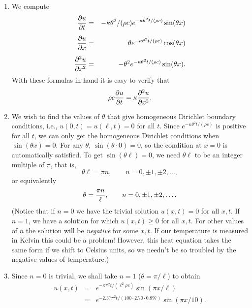 \begin{solution}

\begin{enumerate}
\item We compute
  \begin{eqnarray*}
     {{\partial}u\over {\partial}t} &=& -\kappa \theta^2/(\rho c) e^{-\kappa \theta^2 t/(\rho c)} \sin(\theta x) \\[0.5em]
     {{\partial}u\over {\partial}x} &=& \theta e^{-\kappa \theta^2 t/(\rho c)} \cos(\theta x) \\[0.5em]
     {{\partial}^2 u\over {\partial}x^2} &=& -\theta^2 e^{-\kappa \theta^2 t/(\rho c)} \sin(\theta x).
  \end{eqnarray*}
With these formulas in hand it is easy to verify that 
 \[  \rho c {{\partial} u \over {\partial} t} = \kappa {{\partial}^2 u\over {\partial}x^2}.\]

\item We wish to find the values of $\theta$ that give homogeneous Dirichlet boundary conditions,
      i.e., $u(0,t) = u(\ell,t)=0$ for all $t$.
      Since $e^{-\kappa \theta^2 t/(\rho c)}$ is positive for all $t$, we can only get
      the homogeneous Dirichlet conditions when $\sin(\theta x)=0$.
      For any $\theta$, $\sin(\theta\cdot 0) = 0$, so the condition at $x=0$ is automatically
      satisfied.  To get $\sin(\theta \ell) = 0$, we need $\theta \ell$ 
      to be an integer multiple of $\pi$, that is,
           \[ \theta \ell = \pi n, \qquad n = 0, \pm 1, \pm 2, \ldots,\]
      or equivalently
           \[ \theta  = {\pi n\over \ell}, \qquad n = 0, \pm 1, \pm 2, \ldots.\]
      (Notice that if $n=0$ we have the trivial solution $u(x,t) =0 $ for all $x,t$.
       If $n=1$, we have a solution for which $u(x,t) \ge 0$ for all $x,t$.
       For other values of $n$ the solution will be \emph{negative} for some $x, t$.
       If our temperature is measured in Kelvin this could be a problem!
       However, this heat equation takes the same form if we shift to Celsius units,
       so we needn't be so troubled by the negative values of temperature.)

\item Since $n=0$ is trivial, we shall take $n=1$ ($\theta = \pi/\ell$) to obtain       
                  \begin{eqnarray*}
                        u(x,t) &=& e^{-\kappa \pi^2 t/(\ell^2 \rho c)} \sin(\pi x/\ell)  \\[0.5em]
                               &=& e^{-2.37 \pi^2 t/(100\cdot 2.70\cdot 0.897)} \sin(\pi x/10).
                  \end{eqnarray*}


\end{enumerate}
\end{solution}
